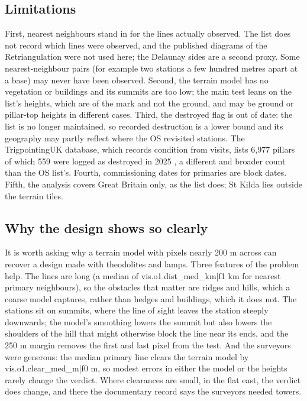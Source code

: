 \documentclass[11pt,a4paper]{article}
\begin{document}
\subsection{Limitations}
First, nearest neighbours stand in for the lines actually observed. The list does not record which lines were observed, and the published diagrams of the Retriangulation \citep{os1967} were not used here; the Delaunay sides are a second proxy. Some nearest-neighbour pairs (for example two stations a few hundred metres apart at a base) may never have been observed. Second, the terrain model has no vegetation or buildings and its summits are too low; the main test leans on the list's heights, which are of the mark and not the ground, and may be ground or pillar-top heights in different cases. Third, the destroyed flag is out of date: the list is no longer maintained, so recorded destruction is a lower bound and its geography may partly reflect where the OS revisited stations. The TrigpointingUK database, which records condition from visits, lists 6,977 pillars of which 559 were logged as destroyed in 2025 \citep{tukpillar}, a different and broader count than the OS list's. Fourth, commissioning dates for primaries are block dates. Fifth, the analysis covers Great Britain only, as the list does; St Kilda lies outside the terrain tiles.

\subsection{Why the design shows so clearly}
It is worth asking why a terrain model with pixels nearly 200 m across can recover a design made with theodolites and lamps. Three features of the problem help. The lines are long (a median of {{vis.o1.dist_med_km|f1}} km for nearest primary neighbours), so the obstacles that matter are ridges and hills, which a coarse model captures, rather than hedges and buildings, which it does not. The stations sit on summits, where the line of sight leaves the station steeply downwards; the model's smoothing lowers the summit but also lowers the shoulders of the hill that might otherwise block the line near its ends, and the 250 m margin removes the first and last pixel from the test. And the surveyors were generous: the median primary line clears the terrain model by {{vis.o1.clear_med_m|f0}} m, so modest errors in either the model or the heights rarely change the verdict. Where clearances are small, in the flat east, the verdict does change, and there the documentary record says the surveyors needed towers.
\end{document}
